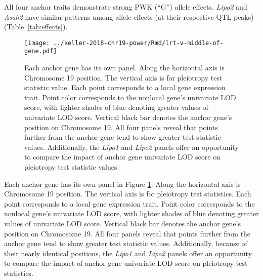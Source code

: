 \documentclass[oneside]{book}
\begin{document}
All four anchor traits demonstrate strong PWK (``G'') allele effects. \emph{Lipo2} and \emph{Asah2} have similar patterns among allele effects (at their respective QTL peaks) (Table~\ref{tab:effects}).



\begin{figure}
    \centering
    \texttt{[image: ../keller-2018-chr19-power/Rmd/lrt-v-middle-of-gene.pdf]}
    \caption[Pleiotropy LRT vs. chromosomal position plots reveal that higher values of pleiotropy LRT tend to correspond to greater interlocus distance and greater univariate LOD score.]{Each anchor gene has its own panel. Along the horizontal axis is Chromosome 19 position. The vertical axis is for pleiotropy test statistic value. Each point corresponds to a local gene expression trait. Point color corresponds to the nonlocal gene's univariate LOD score, with lighter shades of blue denoting greater values of univariate LOD score. Vertical black bar denotes the anchor gene's position on Chromosome 19. All four panels reveal that points further from the anchor gene tend to show greater test statistic values. Additionally, the \emph{Lipo1} and \emph{Lipo2} panels offer an opportunity to compare the impact of anchor gene univariate LOD score on pleiotropy test statistic values.}
    \label{fig:middle}
\end{figure}

Each anchor gene has its own panel in Figure \ref{fig:middle}. Along the horizontal axis is Chromosome 19 position. The vertical axis is for pleiotropy test statistics. Each point corresponds to a local gene expression trait. Point color corresponds to the nonlocal gene's univariate LOD score, with lighter shades of blue denoting greater values of univariate LOD score. Vertical black bar denotes the anchor gene's position on Chromosome 19. All four panels reveal that points further from the anchor gene tend to show greater test statistic values. Additionally, because of their nearly identical positions, the \emph{Lipo1} and \emph{Lipo2} panels offer an opportunity to compare the impact of anchor gene univariate LOD score on pleiotropy test statistics.




\end{document}
